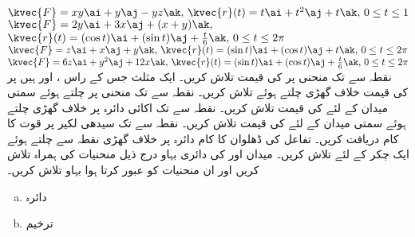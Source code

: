\(\kvec{F}=xy\ai+y\aj-yz\ak,\, \kvec{r}(t)=t\ai+t^2\aj+t\ak,\, 0\le t\le 1\)
\(\kvec{F}=2y\ai+3x\aj+(x+y)\ak,\)\\
\( \kvec{r}(t)=(\cos t)\ai+(\sin t)\aj+\tfrac{t}{6}\ak,\, 0\le t\le 2\pi\)
\(\kvec{F}=z\ai+x\aj+y\ak,\, \kvec{r}(t)=(\sin t)\ai+(\cos t)\aj+t\ak,\, 0\le t\le 2\pi\)
\wf{\unexpanded{
\(-\pi\)
}}
\(\kvec{F}=6z\ai+y^2\aj+12x\ak,\, \kvec{r}(t)=(\sin t)\ai+(\cos t)\aj+\tfrac{t}{6}\ak,\, 0\le t\le 2\pi\)
\\
نقطہ  سے  تک منحنی  پر  کی قیمت تلاش کریں۔
ایک مثلث جس کے راس ،  اور  ہیں پر   کی قیمت خلاف گھڑی چلتے ہوئے  تلاش کریں۔
نقطہ  سے  تک منحنی  پر چلتے ہوئے سمتی میدان  کے لئے  کی قیمت تلاش کریں۔ 
نقطہ  سے  تک اکائی دائرہ  پر خلاف گھڑی چلتے ہوئے سمتی میدان  کے لئے  کی قیمت  تلاش کریں۔ 
نقطہ  سے  تک سیدھی لکیر پر  قوت  کا  کام دریافت کریں۔ 
تفاعل  کی ڈھلوان کا کام دائرہ  پر خلاف گھڑی نقطہ  سے چلتے ہوئے ایک چکر کے لئے   تلاش کریں۔
میدان  اور  کی دائری بہاو درج ذیل منحنیات کی ہمراہ تلاش کریں اور ان منحنیات کو عبور کرتا ہوا بہاو تلاش کریں۔ 
\begin{enumerate}[a.]
\item
دائرہ 
\item
ترخیم 
\end{enumerate}
